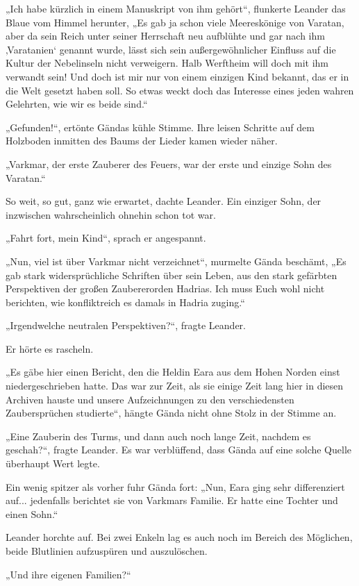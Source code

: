 „Ich habe kürzlich in einem Manuskript von ihm gehört“, flunkerte Leander das Blaue vom Himmel herunter, „Es gab ja schon viele Meereskönige von Varatan, aber da sein Reich unter seiner Herrschaft neu aufblühte und gar nach ihm ‚Varatanien‘ genannt wurde, lässt sich sein außergewöhnlicher Einfluss auf die Kultur der Nebelinseln nicht verweigern. Halb Werftheim will doch mit ihm verwandt sein! Und doch ist mir nur von einem einzigen Kind bekannt, das er in die Welt gesetzt haben soll. So etwas weckt doch das Interesse eines jeden wahren Gelehrten, wie wir es beide sind.“

„Gefunden!“, ertönte Gändas kühle Stimme. Ihre leisen Schritte auf dem Holzboden inmitten des Baums der Lieder kamen wieder näher.

„Varkmar, der erste Zauberer des Feuers, war der erste und einzige Sohn des Varatan.“

So weit, so gut, ganz wie erwartet, dachte Leander. Ein einziger Sohn, der inzwischen wahrscheinlich ohnehin schon tot war.

„Fahrt fort, mein Kind“, sprach er angespannt.

„Nun, viel ist über Varkmar nicht verzeichnet“, murmelte Gända beschämt, „Es gab stark widersprüchliche Schriften über sein Leben, aus den stark gefärbten Perspektiven der großen Zaubererorden Hadrias. Ich muss Euch wohl nicht berichten, wie konfliktreich es damals in Hadria zuging.“

„Irgendwelche neutralen Perspektiven?“, fragte Leander.

Er hörte es rascheln.

„Es gäbe hier einen Bericht, den die Heldin Eara aus dem Hohen Norden einst niedergeschrieben hatte. Das war zur Zeit, als sie einige Zeit lang hier in diesen Archiven hauste und unsere Aufzeichnungen zu den verschiedensten Zaubersprüchen studierte“, hängte Gända nicht ohne Stolz in der Stimme an.

„Eine Zauberin des Turms, und dann auch noch lange Zeit, nachdem es geschah?“, fragte Leander. Es war verblüffend, dass Gända auf eine solche Quelle überhaupt Wert legte.

Ein wenig spitzer als vorher fuhr Gända fort: „Nun, Eara ging sehr differenziert auf... jedenfalls berichtet sie von Varkmars Familie. Er hatte eine Tochter und einen Sohn.“

Leander horchte auf. Bei zwei Enkeln lag es auch noch im Bereich des Möglichen, beide Blutlinien aufzuspüren und auszulöschen.

„Und ihre eigenen Familien?“

